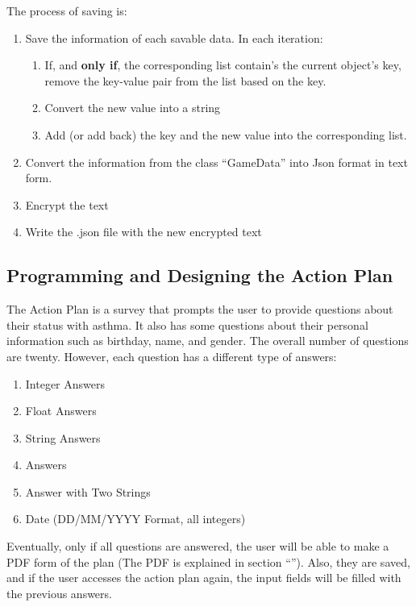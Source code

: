 The process of saving is:

\begin{enumerate}
\item{Save the information of each savable data. In each iteration:}
\begin{enumerate}
\item{If, and \textbf{only if}, the corresponding list contain's the current object's key, remove the key-value pair from the list based on the key.}
\item{Convert the new value into a string}
\item{Add (or add back) the key and the new value into the corresponding list.}
\end{enumerate}
\item{Convert the information from the class  “{\codefont GameData}” into Json format in text form.}
\item{Encrypt the text}
\item{Write the .json file with the new encrypted text}
\end{enumerate}

\subsection{Programming and Designing the Action Plan}
The Action Plan is a survey that prompts the user to provide questions about their status with asthma. It also has some questions about their personal information such as birthday, name, and gender. The overall number of questions are twenty. However, each question has a different type of answers:
\begin{enumerate}
    \item{Integer Answers}
    
    \item{Float Answers}
    
    \item{String Answers}
    
    \item{ Answers}
    
    \item{Answer with Two Strings}
    
    \item{Date (DD/MM/YYYY Format, all integers)}
\end{enumerate}
Eventually, only if all questions are answered, the user will be able to make a PDF form of the plan (The PDF is explained in section “\textbf{}”). Also, they are saved, and if the user accesses the action plan again, the input fields will be filled with the previous answers.

